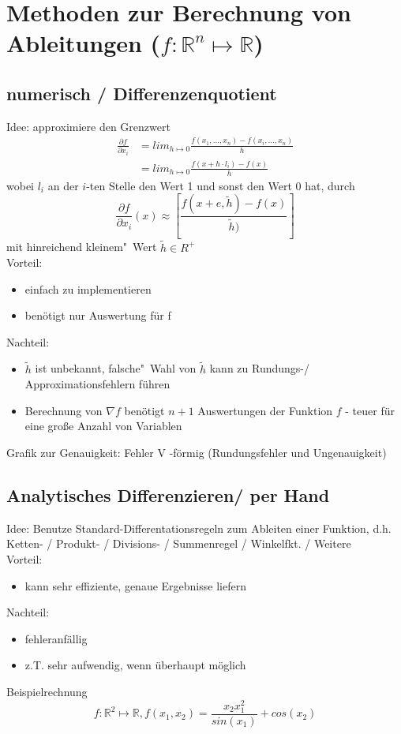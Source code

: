 \section{Methoden zur Berechnung von Ableitungen ($f: \mathbb{R}^n \mapsto \mathbb{R}$)}
\label{chap:differentiation_methods}

\subsection{numerisch / Differenzenquotient}
\label{subsec:numeric/diffquotient}
Idee: approximiere den Grenzwert
\begin{align*}
\frac{\partial f}{\partial x_i} & = lim_{h\mapsto 0} \frac{f(x_1,\dots,x_n) - f(x_i,\dots,x_n)}{h}\\
 &= lim_{h\mapsto 0} \frac{f(x+h \cdot l_i) - f(x)}{h}
\end{align*}
wobei $l_i$ an der $i$-ten Stelle den Wert 1 und sonst den Wert 0 hat, durch 
$$\frac{\partial f}{\partial x_i}(x) \approx \left[\frac{f(x+e,\tilde h)-f(x)}{\tilde h)}\right]$$
mit \glqq hinreichend kleinem"\ Wert $\tilde h \in R^+$\\

\noindent Vorteil:
\begin{itemize}
	\item einfach zu implementieren
	\item benötigt nur Auswertung für f
\end{itemize}
Nachteil:
\begin{itemize}
	\item $\tilde h$ ist unbekannt, \glqq falsche"\ Wahl von $\tilde h$ kann zu Rundungs-/ Approximationsfehlern führen
	\item Berechnung von $\nabla f$ benötigt $n+1$ Auswertungen der Funktion $f$ - teuer für eine große Anzahl von Variablen
\end{itemize}
\vspace{3cm}
Grafik zur Genauigkeit: Fehler V -förmig (Rundungsfehler und Ungenauigkeit)

\subsection{Analytisches Differenzieren/ per Hand}
\label{subsec:analytic_diff/manual}
Idee: Benutze Standard-Differentationsregeln zum Ableiten einer Funktion, d.h. Ketten- / Produkt- / Divisions- / Summenregel / Winkelfkt. / Weitere\\

\noindent
Vorteil:
\begin{itemize}
	\item kann sehr effiziente, genaue Ergebnisse liefern
\end{itemize}
Nachteil:
\begin{itemize}
	\item fehleranfällig
	\item z.T. sehr aufwendig, wenn überhaupt möglich
\end{itemize}
Beispielrechnung
$$f:\mathbb{R}^2\mapsto\mathbb{R}, f(x_1,x_2) = \frac{x_2 x_1^2}{sin(x_1)}+cos(x_2)$$

